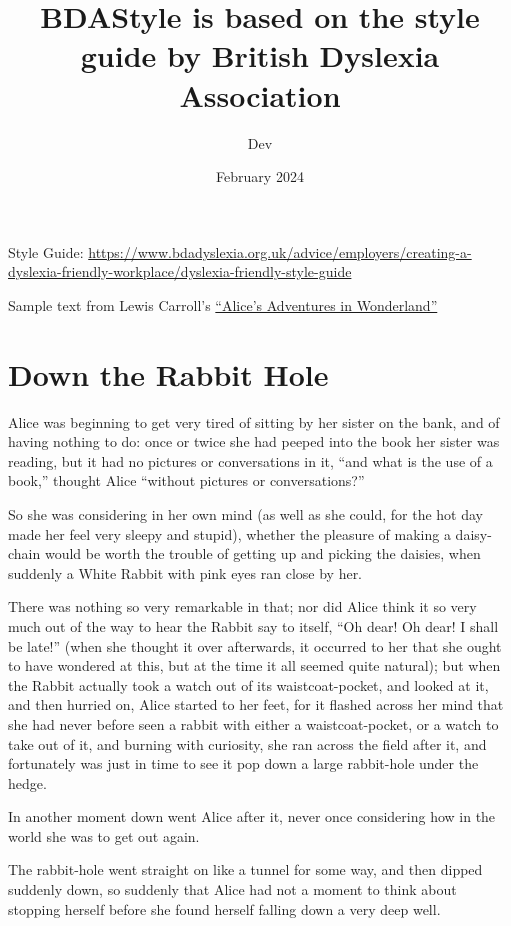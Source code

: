 \documentclass{bdastyle}
\title{BDAStyle is based on the style guide by British Dyslexia Association}
\author{Dev}
\date{February 2024}
\begin{document}
\maketitle

Style Guide: \url{https://www.bdadyslexia.org.uk/advice/employers/creating-a-dyslexia-friendly-workplace/dyslexia-friendly-style-guide}


Sample text from Lewis Carroll's \href{https://www.gutenberg.org/files/11/11-h/11-h.htm}{``Alice's Adventures in Wonderland''}

\section{Down the Rabbit Hole}

Alice was beginning to get very tired of sitting by her sister on the bank, and of having nothing to do: once or twice she had peeped into the book her sister was reading, but it had no pictures or conversations in it, “and what is the use of a book,” thought Alice “without pictures or conversations?”

So she was considering in her own mind (as well as she could, for the hot day made her feel very sleepy and stupid), whether the pleasure of making a daisy-chain would be worth the trouble of getting up and picking the daisies, when suddenly a White Rabbit with pink eyes ran close by her.

There was nothing so very remarkable in that; nor did Alice think it so very much out of the way to hear the Rabbit say to itself, “Oh dear! Oh dear! I shall be late!” (when she thought it over afterwards, it occurred to her that she ought to have wondered at this, but at the time it all seemed quite natural); but when the Rabbit actually took a watch out of its waistcoat-pocket, and looked at it, and then hurried on, Alice started to her feet, for it flashed across her mind that she had never before seen a rabbit with either a waistcoat-pocket, or a watch to take out of it, and burning with curiosity, she ran across the field after it, and fortunately was just in time to see it pop down a large rabbit-hole under the hedge.

In another moment down went Alice after it, never once considering how in the world she was to get out again.

The rabbit-hole went straight on like a tunnel for some way, and then dipped suddenly down, so suddenly that Alice had not a moment to think about stopping herself before she found herself falling down a very deep well.
\end{document}
